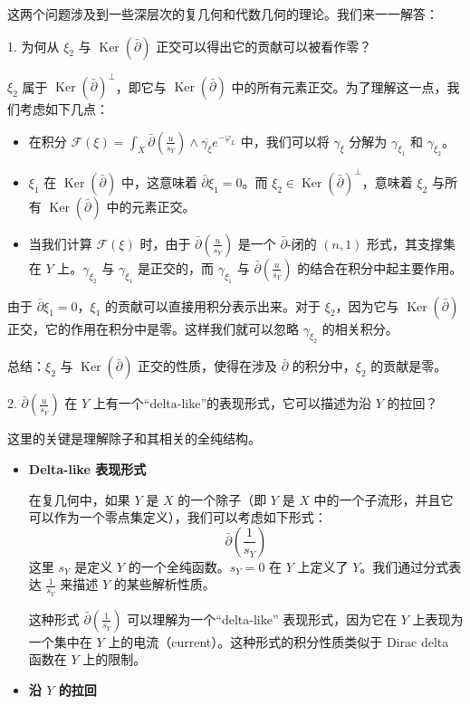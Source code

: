 \begin{remark}
    这两个问题涉及到一些深层次的复几何和代数几何的理论。我们来一一解答：

1. 为何从 $\xi_2$ 与 $\operatorname{Ker}(\bar{\partial})$ 正交可以得出它的贡献可以被看作零？

$\xi_2$ 属于 $\operatorname{Ker}(\bar{\partial})^{\perp}$，即它与 $\operatorname{Ker}(\bar{\partial})$ 中的所有元素正交。为了理解这一点，我们考虑如下几点：
\begin{itemize}
    \item 在积分 $\mathcal{F}(\xi) = \int_X \bar{\partial}\left(\frac{u}{s_Y}\right) \wedge \overline{\gamma_{\xi}} e^{-\varphi_L}$ 中，我们可以将 $\gamma_{\xi}$ 分解为 $\gamma_{\xi_1}$ 和 $\gamma_{\xi_2}$。
    \item $\xi_1$ 在 $\operatorname{Ker}(\bar{\partial})$ 中，这意味着 $\bar{\partial} \xi_1 = 0$。而 $\xi_2 \in \operatorname{Ker}(\bar{\partial})^{\perp}$，意味着 $\xi_2$ 与所有 $\operatorname{Ker}(\bar{\partial})$ 中的元素正交。
    \item 当我们计算 $\mathcal{F}(\xi)$ 时，由于 $\bar{\partial}\left(\frac{u}{s_Y}\right)$ 是一个 $\bar{\partial}$-闭的 $(n, 1)$ 形式，其支撑集在 $Y$ 上。$\gamma_{\xi_2}$ 与 $\gamma_{\xi_1}$ 是正交的，而 $\gamma_{\xi_1}$ 与 $\bar{\partial}\left(\frac{u}{s_Y}\right)$ 的结合在积分中起主要作用。
\end{itemize}

由于 $\bar{\partial} \xi_1 = 0$，$\xi_1$ 的贡献可以直接用积分表示出来。对于 $\xi_2$，因为它与 $\operatorname{Ker}(\bar{\partial})$ 正交，它的作用在积分中是零。这样我们就可以忽略 $\gamma_{\xi_2}$ 的相关积分。

总结：$\xi_2$ 与 $\operatorname{Ker}(\bar{\partial})$ 正交的性质，使得在涉及 $\bar{\partial}$ 的积分中，$\xi_2$ 的贡献是零。

2. $\bar{\partial}\left(\frac{u}{s_Y}\right)$ 在 $Y$ 上有一个“delta-like”的表现形式，它可以描述为沿 $Y$ 的拉回？

这里的关键是理解除子和其相关的全纯结构。
\begin{itemize}
    \item \textbf{Delta-like 表现形式}

在复几何中，如果 $Y$ 是 $X$ 的一个除子（即 $Y$ 是 $X$ 中的一个子流形，并且它可以作为一个零点集定义），我们可以考虑如下形式：
$$
\bar{\partial}\left(\frac{1}{s_Y}\right)
$$
这里 $s_Y$ 是定义 $Y$ 的一个全纯函数。$s_Y = 0$ 在 $Y$ 上定义了 $Y$。我们通过分式表达 $\frac{1}{s_Y}$ 来描述 $Y$ 的某些解析性质。

这种形式 $\bar{\partial}\left(\frac{1}{s_Y}\right)$ 可以理解为一个“delta-like” 表现形式，因为它在 $Y$ 上表现为一个集中在 $Y$ 上的电流（current）。这种形式的积分性质类似于 Dirac delta 函数在 $Y$ 上的限制。
\item \textbf{沿 $Y$ 的拉回}


\end{itemize}
\end{remark}
